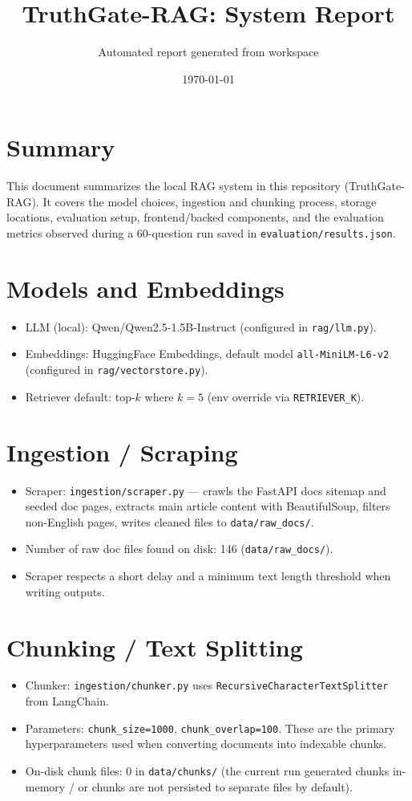 \documentclass[11pt]{article}
\begin{document}
\title{TruthGate-RAG: System Report}
\author{Automated report generated from workspace}
\date{\today}
\maketitle

\section*{Summary}
This document summarizes the local RAG system in this repository (TruthGate-RAG). It covers the model choices, ingestion and chunking process, storage locations, evaluation setup, frontend/backed components, and the evaluation metrics observed during a 60-question run saved in \texttt{evaluation/results.json}.

\section{Models and Embeddings}
\begin{itemize}
  \item LLM (local): Qwen/Qwen2.5-1.5B-Instruct (configured in \texttt{rag/llm.py}).
  \item Embeddings: HuggingFace Embeddings, default model \texttt{all-MiniLM-L6-v2} (configured in \texttt{rag/vectorstore.py}).
  \item Retriever default: top-$k$ where $k=5$ (env override via \texttt{RETRIEVER\_K}).
\end{itemize}

\section{Ingestion / Scraping}
\begin{itemize}
  \item Scraper: \texttt{ingestion/scraper.py} — crawls the FastAPI docs sitemap and seeded doc pages, extracts main article content with BeautifulSoup, filters non-English pages, writes cleaned files to \texttt{data/raw_docs/}.
  \item Number of raw doc files found on disk: 146 (\texttt{data/raw_docs/}).
  \item Scraper respects a short delay and a minimum text length threshold when writing outputs.
\end{itemize}

\section{Chunking / Text Splitting}
\begin{itemize}
  \item Chunker: \texttt{ingestion/chunker.py} uses \texttt{RecursiveCharacterTextSplitter} from LangChain.
  \item Parameters: \texttt{chunk\_size=1000}, \texttt{chunk\_overlap=100}.  These are the primary hyperparameters used when converting documents into indexable chunks.
  \item On-disk chunk files: 0 in \texttt{data/chunks/} (the current run generated chunks in-memory / or chunks are not persisted to separate files by default).
\end{itemize}
\end{document}
